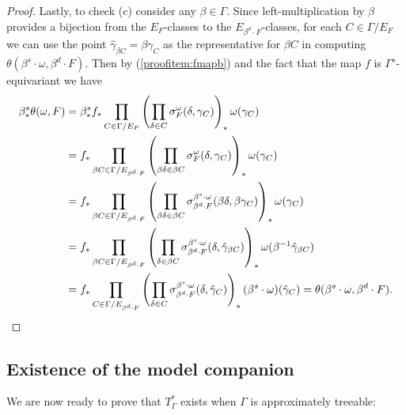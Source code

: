 \documentclass[12pt]{amsart}
\theoremstyle{definition}
\begin{document}
\begin{proof}
	Lastly, to check (c) consider any $\beta \in \Gamma$. Since left-multiplication by $\beta$ provides a bijection from the $E_F$-classes to the $E_{\beta^d \cdot F}$-classes, for each $C \in \Gamma / E_F$ we can use the point $\widehat \gamma_{\beta C} = \beta \gamma_C$ as the representative for $\beta C$ in computing $\theta(\beta^s \cdot \omega, \beta^d \cdot F)$. Then by (\ref{proofitem:fmapb}) and the fact that the map $f$ is $\Gamma^s$-equivariant we have
	\begin{align*}
		\beta^s_* \theta(\omega, F) & = \beta^s_* f_* \prod_{C \in \Gamma / E_F} \left( \prod_{\delta \in C} \sigma_F^\omega(\delta, \gamma_C) \right)_* \omega(\gamma_C)\\
		& = f_* \prod_{\beta C \in \Gamma / E_{\beta^d \cdot F}} \left( \prod_{\beta \delta \in \beta C} \sigma_F^\omega(\delta, \gamma_C) \right)_* \omega(\gamma_C)\\
		& = f_* \prod_{\beta C \in \Gamma / E_{\beta^d \cdot F}} \left( \prod_{\beta \delta \in \beta C} \sigma_{\beta^d \cdot F}^{\beta^s \cdot \omega}(\beta \delta, \beta \gamma_C) \right)_* \omega(\gamma_C)\\
		& = f_* \prod_{\beta C \in \Gamma / E_{\beta^d \cdot F}} \left( \prod_{\delta \in \beta C} \sigma_{\beta^d \cdot F}^{\beta^s \cdot \omega}(\delta, \hat \gamma_{\beta C}) \right)_* \omega(\beta^{-1} \hat \gamma_{\beta C})\\
		& = f_* \prod_{C \in \Gamma / E_{\beta^d \cdot F}} \left( \prod_{\delta \in C} \sigma_{\beta^d \cdot F}^{\beta^s \cdot \omega}(\delta, \hat \gamma_C) \right)_* (\beta^s \cdot \omega)(\hat \gamma_C) = \theta(\beta^s \cdot \omega, \beta^d \cdot F).\qedhere
	\end{align*}
\end{proof}

\subsection{Existence of the model companion}

We are now ready to prove that $T_\Gamma^*$ exists when $\Gamma$ is approximately treeable:
\end{document}
